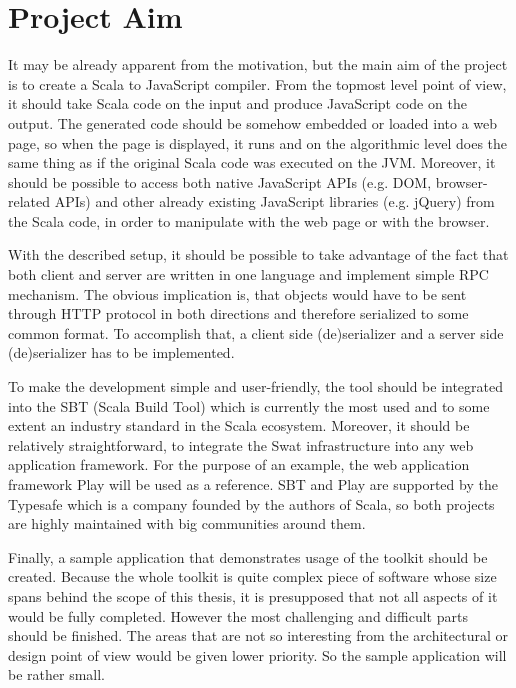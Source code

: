 \documentclass[12pt,a4paper]{report}
\begin{document}
\section{Project Aim}

It may be already apparent from the motivation, but the main aim of the project is to create a Scala to JavaScript compiler. From the topmost level point of view, it should take Scala code on the input and produce JavaScript code on the output. The generated code should be somehow embedded or loaded into a web page, so when the page is displayed, it runs and on the algorithmic level does the same thing as if the original Scala code was executed on the JVM. Moreover, it should be possible to access both native JavaScript APIs (e.g. DOM\cite{Dom}, browser-related APIs) and other already existing JavaScript libraries (e.g. jQuery\cite{Jquery}) from the Scala code, in order to manipulate with the web page or with the browser.

With the described setup, it should be possible to take advantage of the fact that both client and server are written in one language and implement simple RPC mechanism. The obvious implication is, that objects would have to be sent through HTTP protocol in both directions and therefore serialized to some common format. To accomplish that, a client side (de)serializer and a server side (de)serializer has to be implemented.

To make the development simple and user-friendly, the tool should be integrated into the SBT (Scala Build Tool\cite{Sbt}) which is currently the most used and to some extent an industry standard in the Scala ecosystem. Moreover, it should be relatively straightforward, to integrate the Swat infrastructure into any web application framework. For the purpose of an example, the web application framework Play\cite{Play} will be used as a reference. SBT and Play are supported by the Typesafe\cite{Typesafe} which is a company founded by the authors of Scala, so both projects are highly maintained with big communities around them.

Finally, a sample application that demonstrates usage of the toolkit should be created. Because the whole toolkit is quite complex piece of software whose size spans behind the scope of this thesis, it is presupposed that not all aspects of it would be fully completed. However the most challenging and difficult parts should be finished. The areas that are not so interesting from the architectural or design point of view would be given lower priority. So the sample application will be rather small.
\end{document}
